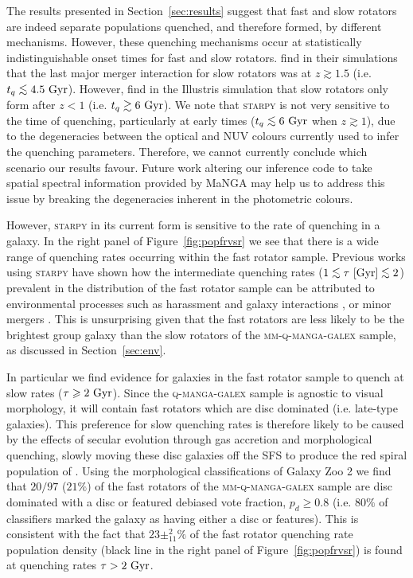 \documentclass[useAMS,usenatbib]{mn2e}
\def\lesssim{\mathrel{\hbox{\rlap{\hbox{\lower3pt\hbox{$\sim$}}}\hbox{\raise2pt\hbox{$<$}}}}}
\begin{document}
The results presented in Section~\ref{sec:results} suggest that fast and slow rotators are indeed separate populations quenched, and therefore formed, by different mechanisms. However, these quenching mechanisms occur at statistically indistinguishable onset times for fast and slow rotators. \cite{khochfar11} find in their simulations that the last major merger interaction for slow rotators was at $z \gtrsim 1.5$ (i.e. $t_q \lesssim 4.5~\rm{Gyr}$). However, \cite{penoyre17}  find in the Illustris simulation that slow rotators only form after $z < 1$ (i.e. $t_q \gtrsim 6~\rm{Gyr}$). We note that \textsc{starpy} is not very sensitive to the time of quenching, particularly at early times ($t_q \lesssim 6~\rm{Gyr}$ when $z \gtrsim 1$), due to the degeneracies between the optical and NUV colours currently used to infer the quenching parameters. Therefore, we cannot currently conclude which scenario our results favour. Future work altering our inference code to take spatial spectral information provided by MaNGA may help us to address this issue by breaking the degeneracies inherent in the photometric colours.

However, \textsc{starpy} in its current form is sensitive to the rate of quenching in a galaxy. In the right panel of Figure~\ref{fig:popfrvsr} we see that there is a wide range of quenching rates occurring within the fast rotator sample. Previous works using \textsc{starpy} have shown how the intermediate quenching rates ($1 \lesssim \tau~[\rm{Gyr}]\lesssim 2$) prevalent in the distribution of the fast rotator sample can be attributed to environmental processes such as harassment and galaxy interactions \citep{smethurst17}, or minor mergers \citep{smethurst15}. This is unsurprising given that the fast rotators are less likely to be the brightest group galaxy than the slow rotators of the \textsc{mm-q-manga-galex} sample, as discussed in Section~\ref{sec:env}.

In particular we find evidence for galaxies in the fast rotator sample to quench at slow rates ($\tau \geq 2~\rm{Gyr}$). Since the \textsc{q-manga-galex} sample is agnostic to visual morphology, it will contain fast rotators which are disc dominated (i.e. late-type galaxies). This preference for slow quenching rates is therefore likely to be caused by the effects of secular evolution through gas accretion and morphological quenching, slowly moving these disc galaxies off the SFS to produce the red spiral population of \cite{masters12a}. Using the morphological classifications of Galaxy Zoo 2 \citep[GZ2][]{lintott11, GZ2} we find that $20/97$ ($21\%$) of the fast rotators of the \textsc{mm-q-manga-galex} sample are disc dominated with a disc or featured debiased vote fraction, $p_d \geq 0.8$ (i.e. $80\%$ of classifiers marked the galaxy as having either a disc or features). This is consistent with the fact that $23\pm^{2}_{11}\%$ of the fast rotator quenching rate population density (black line in the right panel of Figure~\ref{fig:popfrvsr}) is found at quenching rates $\tau > 2~\rm{Gyr}$. 
\end{document}
